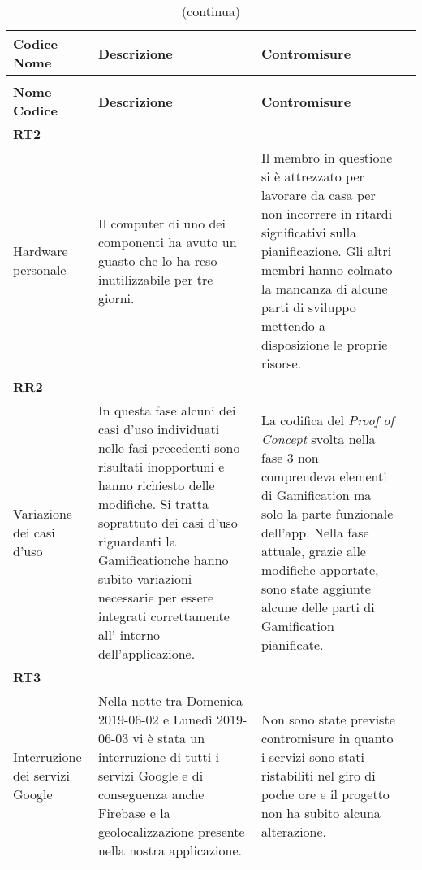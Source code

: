 \renewcommand{\arraystretch}{1.5}
\begin{longtable}{ 
		>{\centering}p{} 
		>{\raggedright}p{}
		>{\raggedright}p{} 
		>{\centering}p{}
	}
	
	
	\caption{Tabella attualizzazione rischi fase 4}\\
	\rowcolorhead
	\textbf{Codice \\ Nome} & \centering{}\textbf{Descrizione} & 
	\centering{}\textbf{Contromisure} 
	\tabularnewline
	\endfirsthead
	\rowcolor{white}\caption[]{(continua)}\\
	\rowcolorhead
	\textbf{Nome \\ Codice} & \centering{}\textbf{Descrizione} & 
	\centering{}\textbf{Contromisure} 
	\tabularnewline
	\endhead
	
	\textbf{RT2} \\ Hardware personale & 
	Il computer di uno dei componenti ha avuto un guasto che lo ha reso inutilizzabile per tre giorni. &
	Il membro in questione si è attrezzato per lavorare da casa per non incorrere in ritardi significativi sulla pianificazione. Gli altri membri hanno colmato la mancanza di alcune parti di sviluppo mettendo a disposizione le proprie risorse.
	\tabularnewline
	
	
	\textbf{RR2} \\ Variazione dei casi d'uso & 
	In questa fase alcuni dei casi d'uso individuati nelle fasi precedenti sono risultati inopportuni e hanno richiesto delle modifiche. Si tratta soprattuto dei casi d'uso riguardanti la Gamification\glosp che hanno subito variazioni necessarie per essere integrati correttamente all' interno dell'applicazione. &
	La codifica del \textit{Proof of Concept} svolta nella fase 3 non comprendeva elementi di Gamification ma solo la parte funzionale dell'app. Nella fase attuale, grazie alle modifiche apportate, sono state aggiunte alcune delle parti di Gamification pianificate.
	\tabularnewline
	
	\textbf{RT3} \\ Interruzione dei servizi Google & 
	Nella notte tra Domenica 2019-06-02 e Lunedì 2019-06-03 vi è stata un interruzione di tutti i servizi Google e di conseguenza anche Firebase e la geolocalizzazione presente nella nostra applicazione. &
	Non sono state previste contromisure in quanto i servizi sono stati ristabiliti nel giro di poche ore e il progetto non ha subito alcuna alterazione.
	\tabularnewline
	

\end{longtable}
